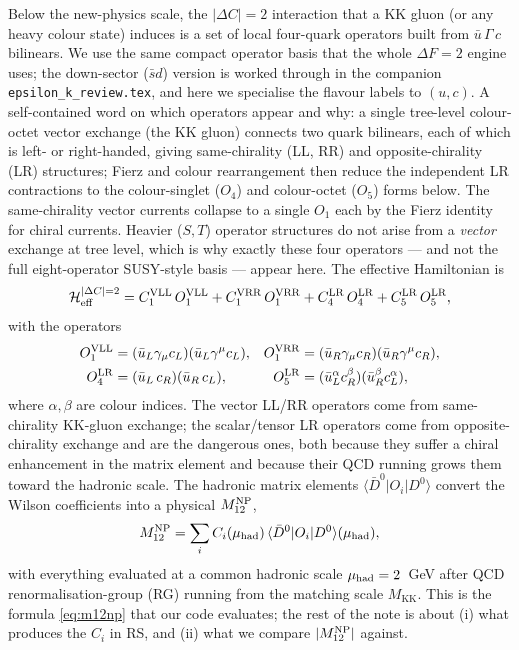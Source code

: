 \documentclass[11pt]{article}
\newcommand{\MKK}{M_{\mathrm{KK}}}
\newcommand{\code}[1]{\texttt{#1}}
\newcommand{\Dz}{D^0}
\newcommand{\Dzbar}{\bar D^0}
\newcommand{\Mtwelve}{M_{12}}
\theoremstyle{definition}
\begin{document}
Below the new-physics scale, the $|\Delta C|=2$ interaction that a KK gluon (or
any heavy colour state) induces is a set of local four-quark operators built
from $\bar u\,\Gamma\, c$ bilinears. We use the same compact operator basis that
the whole $\Delta F=2$ engine uses; the down-sector ($\bar s d$) version is
worked through in the companion \code{epsilon\_k\_review.tex}, and here we
specialise the flavour labels to $(u,c)$. A self-contained word on which
operators appear and why: a single tree-level colour-octet vector exchange (the
KK gluon) connects two quark bilinears, each of which is left- or right-handed,
giving same-chirality (LL, RR) and opposite-chirality (LR) structures; Fierz and
colour rearrangement then reduce the independent LR contractions to the
colour-singlet ($O_4$) and colour-octet ($O_5$) forms below. The same-chirality
vector currents collapse to a single $O_1$ each by the Fierz identity for
chiral currents. Heavier ($S,T$) operator structures do not arise from a
\emph{vector} exchange at tree level, which is why exactly these four operators
--- and not the full eight-operator SUSY-style basis --- appear here. The
effective Hamiltonian is
\begin{equation}
\mathcal{H}^{|\Delta C|=2}_{\rm eff}
= C_1^{\rm VLL}\,O_1^{\rm VLL} + C_1^{\rm VRR}\,O_1^{\rm VRR}
+ C_4^{\rm LR}\,O_4^{\rm LR} + C_5^{\rm LR}\,O_5^{\rm LR},
\label{eq:Heff_op}
\end{equation}
with the operators
\begin{align}
O_1^{\rm VLL} &= (\bar u_L\gamma_\mu c_L)(\bar u_L\gamma^\mu c_L), &
O_1^{\rm VRR} &= (\bar u_R\gamma_\mu c_R)(\bar u_R\gamma^\mu c_R), \\
O_4^{\rm LR} &= (\bar u_L\, c_R)(\bar u_R\, c_L), &
O_5^{\rm LR} &= (\bar u_L^\alpha c_R^\beta)(\bar u_R^\beta c_L^\alpha),
\end{align}
where $\alpha,\beta$ are colour indices. The vector LL/RR operators come from
same-chirality KK-gluon exchange; the scalar/tensor LR operators come from
opposite-chirality exchange and are the dangerous ones, both because they suffer
a chiral enhancement in the matrix element and because their QCD running grows
them toward the hadronic scale. The hadronic matrix elements
$\langle\Dzbar|O_i|\Dz\rangle$ convert the Wilson coefficients into a physical
$\Mtwelve^{\rm NP}$,
\begin{equation}
\Mtwelve^{\rm NP} = \sum_i C_i(\mu_{\rm had})\,\langle\Dzbar|O_i|\Dz\rangle(\mu_{\rm had}),
\label{eq:m12np}
\end{equation}
with everything evaluated at a common hadronic scale $\mu_{\rm had}=2$~GeV after
QCD renormalisation-group (RG) running from the matching scale $\MKK$. This is
the formula \eqref{eq:m12np} that our code evaluates; the rest of the note is
about (i) what produces the $C_i$ in RS, and (ii) what we compare
$|\Mtwelve^{\rm NP}|$ against.
\end{document}
